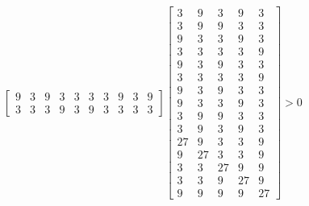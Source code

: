 \documentclass{beamer}
\begin{document}
\begin{frame}
\begin{columns}[c]
$$\begin{bmatrix}
9& 3& 9& 3& 3& 3& 3& 9& 3& 9\\
3& 3& 3& 9& 3& 9& 3& 3& 3& 3
\end{bmatrix}
\begin{bmatrix}
 3& 9& 3& 9& 3\\
 3& 9& 9& 3& 3\\
 9& 3& 3& 9& 3\\
 3& 3& 3& 3& 9\\
 9& 3& 9& 3& 3\\
 3& 3& 3& 3& 9\\
 9& 3& 9& 3& 3\\
 9& 3& 3& 9& 3\\
 3& 9& 9& 3& 3\\
 3& 9& 3& 9& 3\\
27& 9& 3& 3& 9\\
9& 27& 3& 3& 9\\
3& 3& 27& 9& 9\\
3& 3& 9& 27& 9\\
9& 9& 9& 9& 27
\end{bmatrix}>0$$
\end{columns}
\normalsize
\end{frame}
\end{document}
